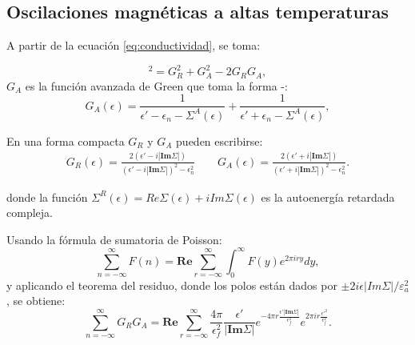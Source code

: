 \subsection{Oscilaciones magnéticas a altas temperaturas}

\begin{frame}
  A partir de la ecuación \ref{eq:conductividad}, se toma:

  \begin{equation}
    [2\textbf{Im}G^{R}(\epsilon)]^2 = G_{R}^{2}+G_{A}^{2}-2G_{R}G_{A},
    \label{2ImGr2}
  \end{equation}
  $G_A$ es la función avanzada de Green que toma la forma \cite{Vega2016}-\cite{Salazar2016}:
  \begin{equation}
    G_A(\epsilon) = \frac{1}{\epsilon'-\epsilon_n-\Sigma^A(\epsilon)} + \frac{1}{\epsilon'+\epsilon_n-\Sigma^A(\epsilon)},
  \end{equation}
\end{frame}

\begin{frame}
  En una forma compacta $G_R$ y $G_A$ pueden escribirse:\\
  \begin{align}
    G_R(\epsilon) = \frac{2(\epsilon'-i |\textbf{Im}\Sigma|)}{(\epsilon'-i |\textbf{Im}\Sigma|)^2-\epsilon_{n}^{2}}    \qquad G_A(\epsilon) = \frac{2(\epsilon'+i |\textbf{Im}\Sigma|)}{(\epsilon'+i |\textbf{Im}\Sigma|)^2-\epsilon_{n}^{2}}.
  \end{align}

  \vspace{0.5cm}
  donde la función $\Sigma^R(\epsilon) = Re\Sigma(\epsilon)+i Im\Sigma(\epsilon)$ es la autoenergía retardada compleja.
\end{frame}

\begin{frame}
  Usando la fórmula de sumatoria de Poisson:
  \begin{equation}
    \sum_{n=-\infty}^{\infty}F(n) = \textbf{Re}\sum_{r=-\infty}^{\infty}\int_{0}^{\infty}F(y)e^{2\pi i r y}dy,
  \label{Fn}
  \end{equation}
  y aplicando el teorema del residuo, donde los polos est\'an dados por $\pm2i\epsilon|Im\Sigma|/\varepsilon_{a}^{2}$, se obtiene:
  \begin{equation}
    \sum_{n=-\infty}^{\infty}G_R G_A =\textbf{Re} \sum_{r=-\infty}^{\infty}\frac{4\pi}{\epsilon_{f}^{2}}\frac{\epsilon'}{|\textbf{Im}\Sigma|} e^{-4\pi r\frac{\epsilon'|\textbf{Im}\Sigma|}{\epsilon_{f}^{2}}} e^{2\pi i r \frac{\epsilon'^2}{\epsilon_{f}^{2}}}.
    \label{GrGa}
  \end{equation}
\end{frame}

